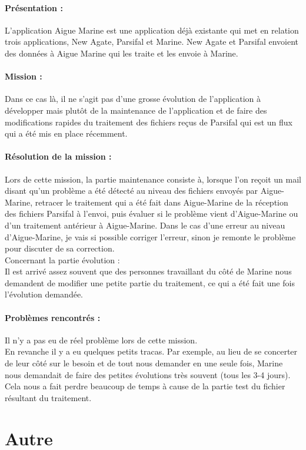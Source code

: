 \documentclass[a4paper,twoside,12pt,openright]{report}
\begin{document}
\paragraph {Présentation :} 
L'application Aigue Marine est une application déjà existante qui met en relation trois applications, New Agate, Parsifal et Marine. New Agate et Parsifal envoient des données à Aigue Marine qui les traite et les envoie à Marine.\\
\paragraph {Mission :}
Dans ce cas là, il ne s'agit pas d'une grosse évolution de l'application à développer mais plutôt de la maintenance de l'application et de faire des modifications rapides du traitement des fichiers reçus de Parsifal qui est un flux qui a été mis en place récemment.
\paragraph {Résolution de la mission :}
Lors de cette mission, la partie maintenance consiste à, lorsque l'on reçoit un mail disant qu'un problème a été détecté au niveau des fichiers envoyés par Aigue-Marine, retracer le traitement qui a été fait dans Aigue-Marine de la réception des fichiers Parsifal à l'envoi, puis évaluer si le problème vient d'Aigue-Marine ou d'un traitement antérieur à Aigue-Marine. Dans le cas d'une erreur au niveau d'Aigue-Marine, je vais si possible corriger l'erreur, sinon je remonte le problème pour discuter de sa correction.\\
Concernant la partie évolution :\\
Il est arrivé assez souvent que des personnes travaillant du côté de Marine nous demandent de modifier une petite partie du traitement, ce qui a été fait une fois l'évolution demandée. 
\paragraph {Problèmes rencontrés :}
Il n'y a pas eu de réel problème lors de cette mission.\\
En revanche il y a eu quelques petits tracas. Par exemple, au lieu de se concerter de leur côté sur le besoin et de tout nous demander en une seule fois, Marine nous demandait de faire des petites évolutions très souvent (tous les 3-4 jours). Cela nous a fait perdre beaucoup de temps à cause de la partie test du fichier résultant du traitement.
\newpage
\section{Autre}
\vspace{1cm}
\end{document}
